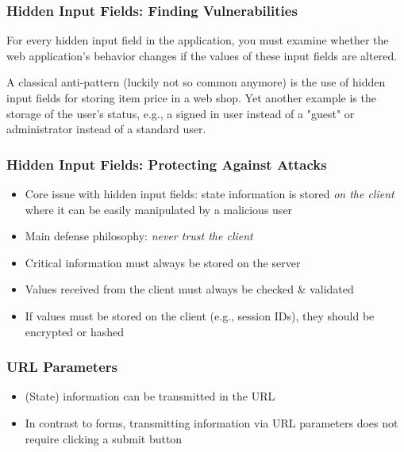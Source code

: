 \begin{frame}
    \frametitle{Hidden Input Fields: Finding Vulnerabilities}
    For every hidden input field in the application, you must examine whether the web application's behavior changes if the values of these input fields are altered.

    A classical anti-pattern (luckily not so common anymore) is the use of hidden input fields for storing item price in a web shop. Yet another example is the storage of the user's status, e.g., a signed in user instead of a "guest" or administrator instead of a standard user.
\end{frame}

\begin{frame}
    \frametitle{Hidden Input Fields: Protecting Against Attacks}
    \begin{itemize}
        \item Core issue with hidden input fields: state information is stored \textit{on the client} where it can be easily manipulated by a malicious user
        \item Main defense philosophy: \textit{never trust the client}
        \item Critical information must always be stored on the server
        \item Values received from the client must always be checked \& validated
        \item If values must be stored on the client (e.g., session IDs), they should be encrypted or hashed
    \end{itemize}     
\end{frame}

\begin{frame}
    \frametitle{URL Parameters}
    \begin{itemize}
        \item (State) information can be transmitted in the URL
        \item In contrast to forms, transmitting information via URL parameters does not require clicking a submit button
    \end{itemize}
\end{frame}

